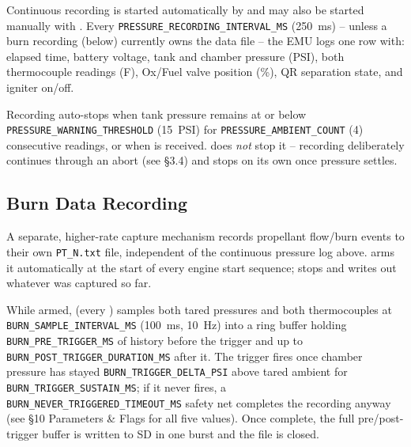 ﻿\documentclass[11pt,letterpaper]{article}
\begin{document}
Continuous recording is started automatically by  and may
also be started manually with . Every
\texttt{PRESSURE\_RECORDING\_INTERVAL\_MS} (250~ms) -- unless a burn
recording (below) currently owns the data file -- the EMU logs one row
with: elapsed time, battery voltage, tank and chamber pressure (PSI),
both thermocouple readings (\textdegree F), Ox/Fuel valve position (\%),
QR separation state, and igniter on/off.

\begin{sloppypar}
Recording auto-stops when tank pressure remains at or below
\texttt{PRESSURE\_WARNING\_THRESHOLD} (15~PSI) for
\texttt{PRESSURE\_AMBIENT\_COUNT} (4) consecutive readings, or when
 is received.  does \emph{not}
stop it -- recording deliberately continues through an abort (see §3.4)
and stops on its own once pressure settles.
\end{sloppypar}

\subsection{Burn Data Recording}

A separate, higher-rate capture mechanism records propellant flow/burn
events to their own \texttt{PT\_N.txt} file, independent of the continuous
pressure log above.  arms it automatically at
the start of every engine start sequence;  stops and
writes out whatever was captured so far.

\begin{sloppypar}
While armed,  (every ) samples
both tared pressures and both thermocouples at \texttt{BURN\_SAMPLE\_INTERVAL\_MS}
(100~ms, 10~Hz) into a  ring buffer holding
\texttt{BURN\_PRE\_TRIGGER\_MS} of history before the trigger and up to
\texttt{BURN\_POST\_TRIGGER\_DURATION\_MS} after it. The trigger fires once
chamber pressure has stayed \texttt{BURN\_TRIGGER\_DELTA\_PSI} above tared
ambient for \texttt{BURN\_TRIGGER\_SUSTAIN\_MS}; if it never fires, a
\texttt{BURN\_NEVER\_TRIGGERED\_TIMEOUT\_MS} safety net completes the
recording anyway (see §10 Parameters \& Flags for all five values). Once
complete, the full pre/post-trigger buffer is written to SD in one burst
and the file is closed.
\end{sloppypar}

\end{document}

